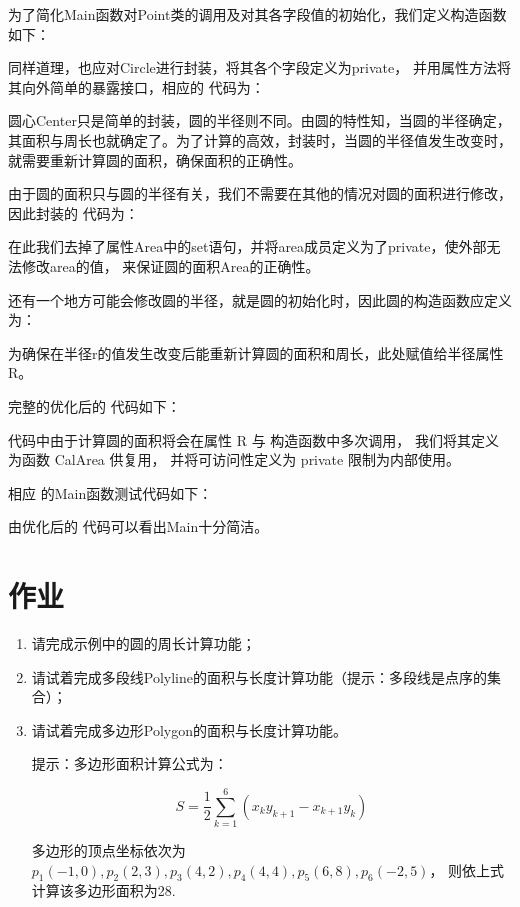 为了简化Main函数对Point类的调用及对其各字段值的初始化，我们定义构造函数如下：


同样道理，也应对Circle进行封装，将其各个字段定义为private，
并用属性方法将其向外简单的暴露接口，相应的 \cs 代码为：



圆心Center只是简单的封装，圆的半径则不同。由圆的特性知，当圆的半径确定，
其面积与周长也就确定了。为了计算的高效，封装时，当圆的半径值发生改变时，
就需要重新计算圆的面积，确保面积的正确性。

由于圆的面积只与圆的半径有关，我们不需要在其他的情况对圆的面积进行修改，
因此封装的 \cs 代码为：



在此我们去掉了属性Area中的set语句，并将area成员定义为了private，使外部无法修改area的值，
来保证圆的面积Area的正确性。

还有一个地方可能会修改圆的半径，就是圆的初始化时，因此圆的构造函数应定义为：



为确保在半径r的值发生改变后能重新计算圆的面积和周长，此处赋值给半径属性R。

完整的优化后的 \cs 代码如下：


代码中由于计算圆的面积将会在属性 R 与 构造函数中多次调用，
我们将其定义为函数 CalArea 供复用，
并将可访问性定义为 private 限制为内部使用。

相应 \cs 的Main函数测试代码如下：



由优化后的 \cs 代码可以看出Main十分简洁。

\section{作业}
\begin{enumerate}
	\item 请完成示例中的圆的周长计算功能；
	\item 请试着完成多段线Polyline的面积与长度计算功能（提示：多段线是点序的集合）；
	\item 请试着完成多边形Polygon的面积与长度计算功能。

	      提示：多边形面积计算公式为：

	      $$S=\frac{1}{2}\sum_{k=1}^{6}{(x_k y_{k+1} - x_{k+1} y_k)}$$

	      多边形的顶点坐标依次为
	      $p_1(-1,0), p_2(2,3), p_3(4,2), p_4(4,4),p_5(6,8),p_6(-2,5)$，
	      则依上式计算该多边形面积为28.
\end{enumerate}
